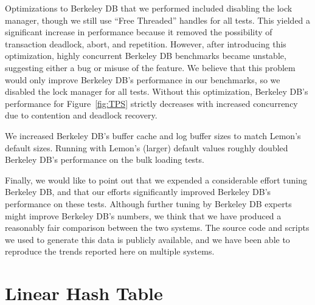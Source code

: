 \documentclass[10pt,letterpaper,twocolumn,english]{article}
\newcommand{\yad}{Lemon\xspace}
\begin{document}
Optimizations to Berkeley DB that we performed included disabling the
lock manager, though we still use ``Free Threaded'' handles for all
tests.  This yielded a significant increase in performance because it
removed the possibility of transaction deadlock, abort, and repetition.
However, after introducing this optimization, highly concurrent
Berkeley DB benchmarks became unstable, suggesting either a bug or
misuse of the feature.  We believe that this problem would only
improve Berkeley DB's performance in our benchmarks, so we disabled
the lock manager for all tests.  Without this optimization, Berkeley
DB's performance for Figure~\ref{fig:TPS} strictly decreases with increased concurrency due to contention and deadlock recovery.

We increased Berkeley DB's buffer cache and log buffer sizes to match
\yad's default sizes.  Running with \yad's (larger) default values
roughly doubled Berkeley DB's performance on the bulk loading tests.

Finally, we would like to point out that we expended a considerable
effort tuning Berkeley DB, and that our efforts significantly
improved Berkeley DB's performance on these tests.  Although further
tuning by Berkeley DB experts might improve Berkeley DB's
numbers, we think that we have produced a reasonably fair comparison
between the two systems.  The source code and scripts we used to
generate this data is publicly available, and we have been able to
reproduce the trends reported here on multiple systems.


\section{Linear Hash Table\label{sub:Linear-Hash-Table}}



%
\end{document}
